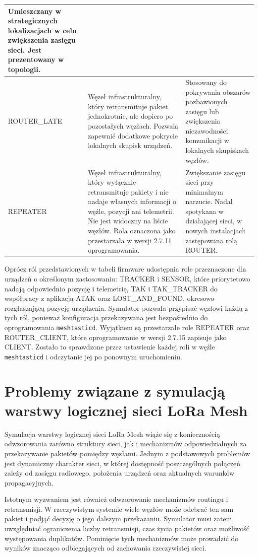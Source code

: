 \documentclass[12pt,a4paper,twoside]{report}
\theoremstyle{definition} %
\begin{document}
\begin{longtable}{|p{3.6cm}|p{5.2cm}|p{5.2cm}|}
    Umieszczany w strategicznych lokalizacjach w celu zwiększenia zasięgu sieci. Jest prezentowany w topologii. \\
    \hline
    ROUTER\_LATE &
    Węzeł infrastrukturalny, który retransmituje pakiet jednokrotnie, ale dopiero po pozostałych węzłach. Pozwala zapewnić dodatkowe pokrycie lokalnych skupisk urządzeń. &
    Stosowany do pokrywania obszarów pozbawionych zasięgu lub zwiększenia niezawodności komunikacji w lokalnych skupiskach węzłów. \\
    \hline
    REPEATER &
    Węzeł infrastrukturalny, który wyłącznie retransmituje pakiety i nie nadaje własnych informacji o węźle, pozycji ani telemetrii. Nie jest widoczny na liście węzłów. Rola oznaczona jako przestarzała w wersji 2.7.11 oprogramowania. &
    Zwiększanie zasięgu sieci przy minimalnym narzucie. Nadal spotykana w działającej sieci, w nowych instalacjach zastępowana rolą ROUTER. \\
    \hline
\end{longtable}

Oprócz ról przedstawionych w tabeli firmware udostępnia role przeznaczone dla urządzeń o określonym zastosowaniu: TRACKER i SENSOR, które priorytetowo nadają odpowiednio pozycję i telemetrię, TAK i TAK\_TRACKER do współpracy z aplikacją ATAK oraz LOST\_AND\_FOUND, okresowo rozgłaszającą pozycję urządzenia. Symulator pozwala przypisać węzłowi każdą z tych ról, ponieważ konfiguracja przekazywana jest bezpośrednio do oprogramowania \texttt{meshtasticd}. Wyjątkiem są przestarzałe role REPEATER oraz ROUTER\_CLIENT, które oprogramowanie w wersji 2.7.15 zapisuje jako CLIENT. Zostało to sprawdzone przez ustawienie każdej roli w węźle \texttt{meshtasticd} i odczytanie jej po ponownym uruchomieniu.

\section{Problemy związane z symulacją warstwy logicznej sieci LoRa Mesh}

Symulacja warstwy logicznej sieci LoRa Mesh wiąże się z koniecznością odwzorowania zarówno struktury sieci, jak i mechanizmów odpowiedzialnych za przekazywanie pakietów pomiędzy węzłami. Jednym z podstawowych problemów jest dynamiczny charakter sieci, w której dostępność poszczególnych połączeń zależy od zasięgu radiowego, położenia urządzeń oraz aktualnych warunków propagacyjnych.

Istotnym wyzwaniem jest również odwzorowanie mechanizmów routingu i retransmisji. W rzeczywistym systemie wiele węzłów może odebrać ten sam pakiet i podjąć decyzję o jego dalszym przekazaniu. Symulator musi zatem uwzględniać ograniczenia liczby retransmisji, czas życia pakietów oraz możliwość występowania duplikatów. Pominięcie tych mechanizmów może prowadzić do wyników znacząco odbiegających od zachowania rzeczywistej sieci.
\end{document}
